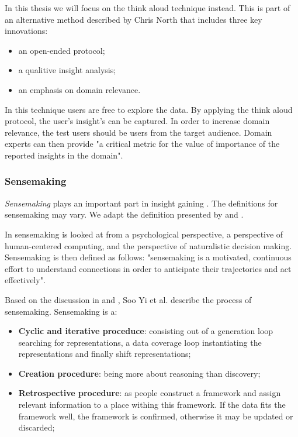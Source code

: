 In this thesis we will focus on the think aloud technique instead. This is part of an alternative method described by Chris North that includes three key innovations\cite{north:2006}:

\begin{itemize}
	\item an open-ended protocol;
	\item a qualitive insight analysis;
	\item an emphasis on domain relevance.
\end{itemize}

In this technique users are free to explore the data. By applying the think aloud protocol, the user's insight's can be captured. In order to increase domain relevance, the test users should be users from the target audience. Domain experts can then provide "a critical metric for the value of importance of the reported insights in the domain"\cite{north:2006}.


\subsubsection{Sensemaking}\label{chapter:literature_study:section:user:subsection:insight:subsubsection:sensemaking}

\emph{Sensemaking} plays an important part in insight gaining \cite{yi:2008}. The definitions for sensemaking may vary. We adapt the definition presented by \cite{Klein:2006:MSS:1158821.1159015} and \cite{yi:2008}.

In \cite{Klein:2006:MSS:1158821.1159015} sensemaking is looked at from a psychological perspective, a perspective of human-centered computing, and the perspective of naturalistic decision making. Sensemaking is then defined as follows: "sensemaking is a motivated, continuous effort to understand connections in order to anticipate their trajectories and act effectively"\cite{Klein:2006:MSS:1158821.1159015}.

Based on the discussion in \cite{klein:2006:MSS:1175882.1176017} and \cite{yi:2008}, Soo Yi et al. describe the process of sensemaking. Sensemaking is a:

\begin{itemize}
	\item \textbf{Cyclic and iterative proceduce}: consisting out of a generation loop searching for representations, a data coverage loop instantiating the representations and finally shift representations;
	\item \textbf{Creation procedure}: being more about reasoning than discovery;
	\item \textbf{Retrospective procedure}: as people construct a framework and assign relevant information to a place withing this framework. If the data fits the framework well, the framework is confirmed, otherwise it may be updated or discarded;
\end{itemize}

